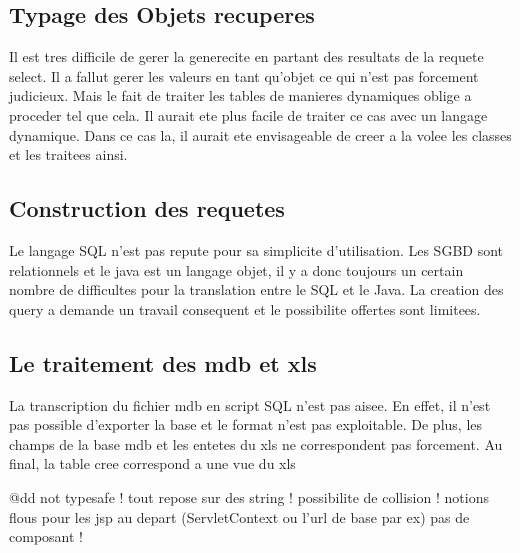 \subsection{Typage des Objets recuperes}
Il est tres difficile de gerer la generecite en partant des resultats de la requete select. Il a fallut gerer les valeurs en tant qu'objet ce qui n'est pas forcement judicieux. Mais le fait de traiter les tables de manieres dynamiques oblige a proceder tel que cela. Il aurait ete plus facile de traiter ce cas avec un langage dynamique. Dans ce cas la, il aurait ete envisageable de creer a la volee les classes et les traitees ainsi.
\subsection{Construction des requetes}
Le langage SQL n'est pas repute pour sa simplicite d'utilisation. Les SGBD sont relationnels et le java est un langage objet, il y a donc toujours un certain nombre de difficultes pour la translation entre le SQL et le Java. La creation des query a demande un travail consequent et le possibilite offertes sont limitees.
\subsection{Le traitement des mdb et xls}
La transcription du fichier mdb en script SQL n'est pas aisee. En effet, il n'est pas possible d'exporter la base et le format n'est pas exploitable. De plus, les champs de la base mdb et les entetes du xls ne correspondent pas forcement. Au final, la table cree correspond a une vue du xls





@dd
not typesafe !
tout repose sur des string !
possibilite de collision !
notions flous pour les jsp  au depart (ServletContext ou l'url de base par ex)
pas de composant !